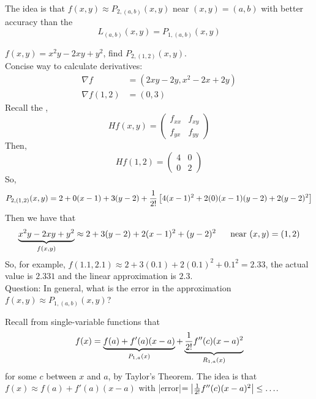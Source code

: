 \documentclass[english, 11pt]{article}
\begin{document}
The idea is that $f(x,y) \approx P_{2,(a,b)}(x,y)$ near $(x,y) = (a,b)$ with better accuracy than the 
\[ L_{(a,b)}(x,y) = P_{1,(a,b)}(x,y) \]

\begin{exmp}
  $f(x,y) = x^2y - 2xy + y^2$, find $P_{2,(1,2)}(x,y)$. \\

  Concise way to calculate derivatives:
  \begin{align*}
    \nabla f & = (2xy-2y,x^2-2x+2y) \\
    \nabla f(1,2) & = (0,3)
  \end{align*}
  Recall the ,
  \[ Hf(x,y) = \left(\begin{matrix} f_{xx} & f_{xy} \\ f_{yx} & f_{yy}  \end{matrix}\right) \]
  Then,
  \[ Hf(1,2) = \left(\begin{matrix} 4 & 0 \\ 0 & 2  \end{matrix}\right) \]
  So,
  \[ P_{2,(1,2)}(x,y) = 2 + 0(x-1) + 3(y-2) + \frac{1}{2!}\left[4(x-1)^2 + 2(0)(x-1)(y-2) + 2(y-2)^2 \right] \]
  Then we have that
  \[ \underbrace{x^2y - 2xy + y^2}_{f(x,y)} \approx 2 + 3(y-2)+2(x-1)^2 + (y-2)^2 \mbox{ \ \ \ \ near $(x,y) = (1,2)$} \]
  So, for example, $f(1.1,2.1) \approx 2 + 3(0.1) + 2(0.1)^2 + 0.1^2 = 2.33$, the actual value is $2.331$ and the linear approximation is $2.3$. \\

  Question: In general, what is the error in the approximation $f(x,y) \approx P_{1,(a,b)}(x,y)$?
\end{exmp}

Recall from single-variable functions that
\[ f(x) = \underbrace{f(a) + f'(a)(x-a)}_{P_{1,a}(x)} + \underbrace{\frac{1}{2!}f''(c)(x-a)^2}_{R_{1,a}(x)} \]
for some $c$ between $x$ and $a$, by Taylor's Theorem. The idea is that $f(x) \approx f(a) + f'(a)(x-a)$ with |error|$ = \left|\frac{1}{2!}f''(c)(x-a)^2 \right| \leq \ldots$.
\end{document}
